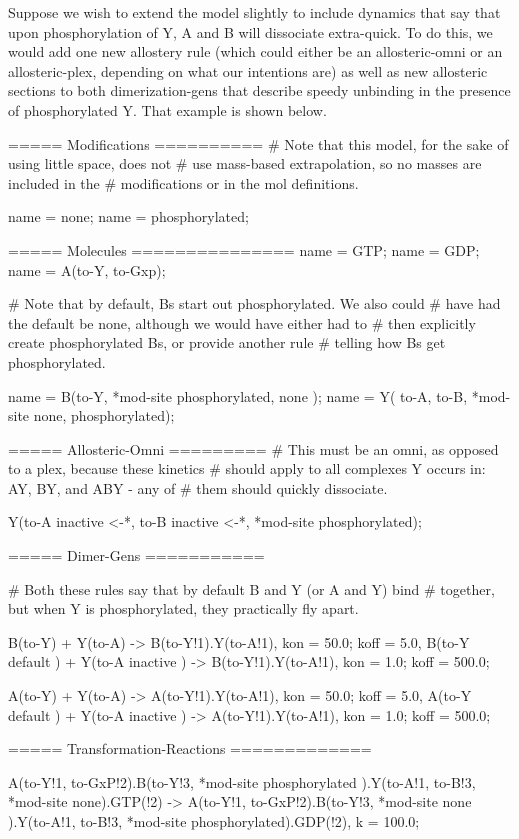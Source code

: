 Suppose we wish to extend the model slightly to include dynamics that
say that upon phosphorylation of Y, A and B will dissociate
extra-quick.  To do this, we would add one new allostery rule (which
could either be an allosteric-omni or an allosteric-plex, depending on
what our intentions are) as well as new allosteric sections to both
dimerization-gens that describe speedy unbinding in the presence of
phosphorylated Y.  That example is shown below.  



\begin{ExampleMZR}
===== Modifications ==========
# Note that this model, for the sake of using little space, does not
# use mass-based extrapolation, so no masses are included in the
# modifications or in the mol definitions.

name = none;
name = phosphorylated;


===== Molecules ===============
name = GTP;
name = GDP;
name = A(to-Y, to-Gxp);

# Note that by default, Bs start out phosphorylated.  We also could
# have had the default be none, although we would have either had to
# then explicitly create phosphorylated Bs, or provide another rule
# telling how Bs get phosphorylated.

name = B(to-Y, *mod-site {phosphorylated, none} );
name = Y( to-A, to-B, *mod-site {none, phosphorylated});

===== Allosteric-Omni =========
# This must be an omni, as opposed to a plex, because these kinetics
# should apply to all complexes Y occurs in: AY, BY, and ABY - any of
# them should quickly dissociate.

Y(to-A {inactive <-*}, to-B {inactive <-*}, *mod-site {phosphorylated});


===== Dimer-Gens ===========

# Both these rules say that by default B and Y (or A and Y) bind
# together, but when Y is phosphorylated, they practically fly apart. 

B(to-Y) + Y(to-A) -> B(to-Y!1).Y(to-A!1),
   kon = 50.0;
   koff = 5.0,
  B(to-Y {default} ) + Y(to-A {inactive} ) -> B(to-Y!1).Y(to-A!1),
     kon = 1.0;
     koff = 500.0;

A(to-Y) + Y(to-A) -> A(to-Y!1).Y(to-A!1),
   kon = 50.0;
   koff = 5.0,
  A(to-Y {default} ) + Y(to-A {inactive} ) -> A(to-Y!1).Y(to-A!1),
     kon = 1.0;
     koff = 500.0;

===== Transformation-Reactions =============

A(to-Y!1, to-GxP!2).B(to-Y!3, *mod-site {phosphorylated} ).Y(to-A!1, to-B!3, *mod-site {none}).GTP(!2) 
 ->
  A(to-Y!1, to-GxP!2).B(to-Y!3, *mod-site {none} ).Y(to-A!1, to-B!3, *mod-site {phosphorylated}).GDP(!2),
  k = 100.0; 

\end{ExampleMZR}



